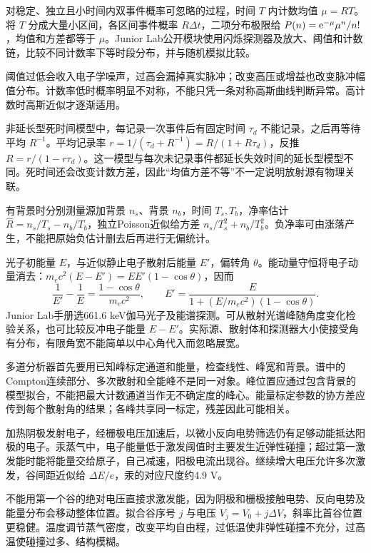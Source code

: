 对稳定、独立且小时间内双事件概率可忽略的过程，时间 $T$ 内计数均值 $\mu=RT$。将 $T$ 分成大量小区间，各区间事件概率 $R\Delta t$，二项分布极限给 $P(n)=\mathrm e^{-\mu}\mu^n/n!$，均值和方差都等于 $\mu$。Junior Lab公开模块使用闪烁探测器及放大、阈值和计数链，比较不同计数率下等时段分布，并与随机模拟比较。

阈值过低会收入电子学噪声，过高会漏掉真实脉冲；改变高压或增益也改变脉冲幅值分布。计数率低时概率明显不对称，不能只凭一条对称高斯曲线判断异常。高计数时高斯近似才逐渐适用。

非延长型死时间模型中，每记录一次事件后有固定时间 $\tau_d$ 不能记录，之后再等待平均 $R^{-1}$。平均记录率 $r=1/(\tau_d+R^{-1})=R/(1+R\tau_d)$，反推 $R=r/(1-r\tau_d)$。这一模型与每次未记录事件都延长失效时间的延长型模型不同。死时间还会改变计数方差，因此“均值方差不等”不一定说明放射源有物理关联。

有背景时分别测量源加背景 $n_s$、背景 $n_b$，时间 $T_s,T_b$，净率估计 $\hat R=n_s/T_s-n_b/T_b$，独立Poisson近似给方差 $n_s/T_s^2+n_b/T_b^2$。负净率可由涨落产生，不能把原始负估计删去后再进行无偏统计。

光子初能量 $E$，与近似静止电子散射后能量 $E'$，偏转角 $\theta$。能动量守恒将电子动量消去：$m_ec^2(E-E')=EE'(1-\cos\theta)$，因而
\[
\frac1{E'}-\frac1E=\frac{1-\cos\theta}{m_ec^2},\qquad
E'=\frac E{1+(E/m_ec^2)(1-\cos\theta)}.
\]
Junior Lab手册选661.6 keV伽马光子及能谱探测。可从散射光谱峰随角度变化检验关系，也可比较反冲电子能量 $E-E'$。实际源、散射体和探测器大小使接受角有分布，有限角宽不能简单以中心角代入而忽略展宽。

多道分析器首先要用已知峰标定通道和能量，检查线性、峰宽和背景。谱中的Compton连续部分、多次散射和全能峰不是同一对象。峰位置应通过包含背景的模型拟合，不能把最大计数通道当作无不确定度的峰心。能量标定参数的协方差应传到每个散射角的结果；各峰共享同一标定，残差因此可能相关。

加热阴极发射电子，经栅极电压加速后，以微小反向电势筛选仍有足够动能抵达阳极的电子。汞蒸气中，电子能量低于激发阈值时主要发生近弹性碰撞；超过第一激发能时能将能量交给原子，自己减速，阳极电流出现谷。继续增大电压允许多次激发，谷间距近似给 $\Delta E/e$，汞的对应尺度约4.9 V。

不能用第一个谷的绝对电压直接求激发能，因为阴极和栅极接触电势、反向电势及能量分布会移动整体位置。拟合谷序号 $j$ 与电压 $V_j=V_0+j\Delta V$，斜率比首谷位置更稳健。温度调节蒸气密度，改变平均自由程，过低温使非弹性碰撞不充分，过高温使碰撞过多、结构模糊。

